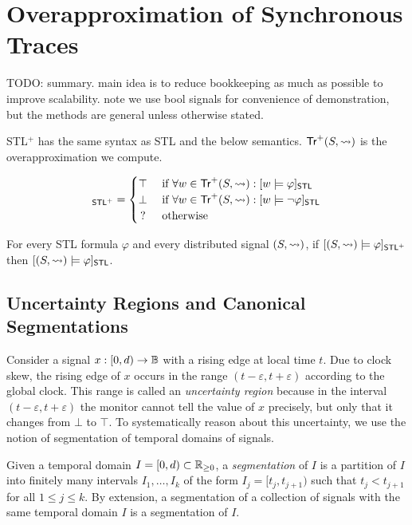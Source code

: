 \section{Overapproximation of Synchronous Traces} \label{sec:approach}
\alert{TODO: summary. main idea is to reduce bookkeeping as much as possible to improve scalability. note we use bool signals for convenience of demonstration, but the methods are general unless otherwise stated.}

STL$^+$ has the same syntax as STL and the below semantics.
$\mathsf{Tr}^+(S,{\rightsquigarrow})$ is the overapproximation we compute.

\small
\begin{equation*}
	[(S,{\hb}) \models \varphi]_{\mathsf{STL}^+} = 
	\begin{cases}
		\top & \text{ if } \forall w \in \tr^+(S,{\hb}) : [w \models \varphi]_{\mathsf{STL}} \\
		\bot & \text{ if } \forall w \in \tr^+(S,{\hb}) : [w \models \lnot\varphi]_{\mathsf{STL}} \\
		\,? & \text{ otherwise}
	\end{cases}
\end{equation*}
\normalsize

\begin{theorem}
	For every STL formula $\varphi$ and every distributed signal $(S,{\rightsquigarrow})$, if $[(S,{\rightsquigarrow}) \models \varphi]_{\mathsf{STL}^+}$ then $[(S,{\rightsquigarrow}) \models \varphi]_{\mathsf{STL}}$.
\end{theorem}

\subsection{Uncertainty Regions and Canonical Segmentations}

Consider a signal $x : [0,d) \to \mathbb{B}$ with a rising edge at local time $t$.
Due to clock skew, the rising edge of $x$ occurs in the range $(t - \varepsilon, t + \varepsilon)$ according to the global clock.
This range is called an \emph{uncertainty region} because in the interval $(t - \varepsilon, t + \varepsilon)$ the monitor cannot tell the value of $x$ precisely, but only that it changes from $\bot$ to $\top$.
To systematically reason about this uncertainty, we use the notion of segmentation of temporal domains of signals.

Given a temporal domain $I = [0,d) \subset \mathbb{R}_{\geq 0}$, a \emph{segmentation} of $I$ is a partition of $I$ into finitely many intervals $I_1, \ldots, I_k$ of the form $I_j = [t_j, t_{j+1})$ such that $t_j < t_{j+1}$ for all $1 \leq j \leq k$.
By extension, a segmentation of a collection of signals with the same temporal domain $I$ is a segmentation of $I$.

